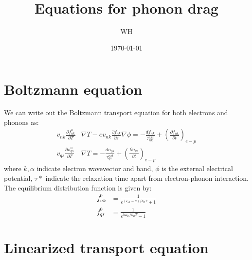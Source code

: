 \documentclass{article}
\newcommand{\pfrac}[2]{\frac{\partial #1}{\partial #2}}
\begin{document}
\title{Equations for phonon drag}
\author{WH}
\date{\today}
\maketitle

\section{Boltzmann equation}
We can write out the Boltzmann transport equation for both electrons and phonons as:
\begin{align}
    v_{nk} \pfrac{f_{nk}^0}{T} &\nabla T - 
      e v_{nk} \pfrac{f_{nk}^0}{\varepsilon}\nabla \phi = 
        -\frac{df_{nk}}{\tau_{nk}^{ext}} + \left(\pfrac{f_{nk}}{t}\right)_{e-p} \label{BTE1} \\
    v_{qs} \pfrac{n_{qs}^0}{T} &\nabla T = 
      -\frac{dn_{qs}}{\tau_{qs}^{ext}} + \left(\pfrac{n_{qs}}{t}\right)_{e-p} \label{BTE2}
\end{align}
where $k, \alpha$ indicate electron wavevector and band, $\phi$ is the external electrical potential, 
$\tau*$ indicate the relaxation time apart from electron-phonon interaction. The equilibrium 
distribution function is given by:
\begin{align}
    f_{nk}^0 &= \frac{1}{e^{(\varepsilon_{nk}-\mu)/k_B T} +1} \\
    f_{qs}^0 &= \frac{1}{e^{\hbar \omega_{qs}/k_B T} -1}  
\end{align}

\section{Linearized transport equation}
\end{document}
